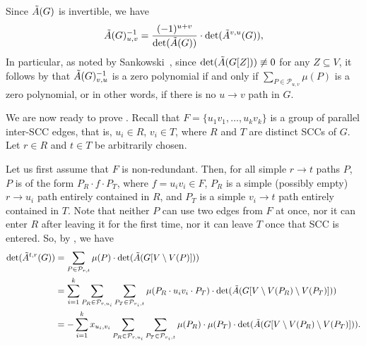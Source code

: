\documentclass[11pt]{article}
\begin{document}
{Since $\tilde{A}(G)$ is invertible, we have
  $$\tilde{A}(G)^{-1}_{u,v}=\frac{(-1)^{u+v}}{\det(\tilde{A}(G))}\cdot \det(\tilde{A}^{v,u}(G)),$$
In particular, as noted by Sankowski~\cite{Sankowski04}, since $\det(\tilde{A}(G[Z]))\not\equiv0$ for any $Z\subseteq V$, it follows by 
that $\tilde{A}(G)^{-1}_{v,u}$ is a zero polynomial if and only if $\sum_{P\in \mathcal{P}_{u,v}}\mu(P)$ is a zero polynomial, or in other words, if there is no
$u\to v$ path in $G$.

We are now ready to prove .
Recall that $F=\{u_1v_1,\ldots,u_kv_k\}$ is
a group of parallel inter-SCC edges, that is,
$u_i\in R$, $v_i\in T$, where $R$ and $T$
are distinct SCCs of $G$. Let $r\in R$
and $t\in T$ be arbitrarily chosen.

Let us first assume that $F$ is non-redundant.
Then,
for all
simple $r\to t$ paths $P$, $P$ is of the form $P_R\cdot f\cdot P_T$, where
$f=u_iv_i\in F$, $P_R$ is a simple (possibly empty) $r\to u_i$ path
entirely contained in $R$, and $P_T$ is a simple $v_i\to t$ path
entirely contained in $T$.
Note that neither $P$ can use two edges from $F$ at once, nor it can enter $R$ after leaving it for the first time, nor it can leave $T$ once that SCC is entered.
So, by , we have
\begin{align*}
  \det(\tilde{A}^{t,r}(G))
  &=\sum_{P\in \mathcal{P}_{r,t}} \mu(P)\cdot \det(\tilde{A}(G[V\setminus V(P)]))\\
  &=\sum_{i=1}^k \sum_{P_R\in \mathcal{P}_{r,u_i}}\sum_{P_T\in \mathcal{P}_{v_i,t}}\mu(P_R\cdot u_iv_i\cdot P_T)\cdot \det(\tilde{A}(G[V\setminus V(P_R)\setminus V(P_T)]))\\
  &=-\sum_{i=1}^k x_{u_i,v_i}\sum_{P_R\in \mathcal{P}_{r,u_i}}\sum_{P_T\in \mathcal{P}_{v_i,t}}\mu(P_R)\cdot \mu(P_T)\cdot \det(\tilde{A}(G[V\setminus V(P_R)\setminus V(P_T)])).
\end{align*}

}
\end{document}
